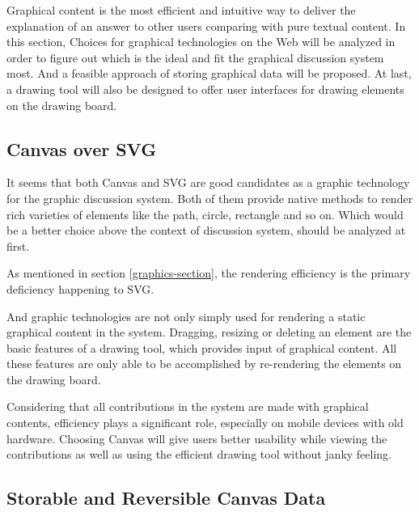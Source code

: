 
Graphical content is the most efficient and intuitive way to deliver the explanation of an answer to other users comparing with pure textual content. In this section, Choices for graphical technologies on the Web will be analyzed in order to figure out which is the ideal and fit the graphical discussion system most. And a feasible approach of storing graphical data will be proposed. At last, a drawing tool will also be designed to offer user interfaces for drawing elements on the drawing board.

\subsection{Canvas over SVG}
It seems that both Canvas and SVG are good candidates as a graphic technology for the graphic discussion system. Both of them provide native methods to render rich varieties of elements like the path, circle, rectangle and so on. Which would be a better choice above the context of discussion system, should be analyzed at first.

As mentioned in section \ref{graphics-section}, the rendering efficiency is the primary deficiency happening to SVG. 

And graphic technologies are not only simply used for rendering a static graphical content in the system. Dragging, resizing or deleting an element are the basic features of a drawing tool, which provides input of graphical content. All these features are only able to be accomplished by re-rendering the elements on the drawing board. 

Considering that all contributions in the system are made with graphical contents, efficiency plays a significant role, especially on mobile devices with old hardware. Choosing Canvas will give users better usability while viewing the contributions as well as using the efficient drawing tool without janky feeling. 


\subsection{Storable and Reversible Canvas Data }\label{subsec:storable-canvas-data}

